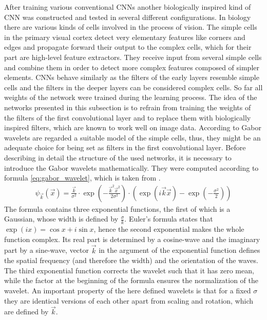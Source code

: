 \documentclass[11pt, a4paper]{article}
\begin{document}
After training various conventional \acp{CNN} another biologically inspired kind of \ac{CNN} was constructed and tested in several different configurations. In biology there are various kinds of cells involved in the process of vision. The simple cells in the primary visual cortex detect very elementary features like corners and edges and propagate forward their output to the complex cells, which for their part are high-level feature extractors. They receive input from several simple cells and combine them in order to detect more complex features composed of simpler elements. \acp{CNN} behave similarly as the filters of the early layers resemble simple cells and the filters in the deeper layers can be considered complex cells. So far all weights of the network were trained during the learning process. The idea of the networks presented in this subsection is to refrain from training the weights of the filters of the first convolutional layer and to replace them with biologically inspired filters, which are known to work well on image data. According to \cite{ebgm} Gabor wavelets are regarded a suitable model of the simple cells, thus, they might be an adequate choice for being set as filters in the first convolutional layer. Before describing in detail the structure of the used networks, it is necessary to introduce the Gabor wavelets mathematically. They were computed according to formula \eqref{eq:gabor_wavelet}, which is taken from \cite{ebgm}.
\begin{align}
\label{eq:gabor_wavelet}
\psi_{\vec{k}}(\vec{x}) = \frac{\vec{k}}{\sigma^2} \cdot \exp\left(-\frac{\vec{k}^2\vec{x}^2}{2\sigma^2}\right) \cdot \left(\exp\left(i\vec{k}\vec{x}\right) - \exp\left(-\frac{\sigma^2}{2}\right)\right)
\end{align}
The formula contains three exponential functions, the first of which is a Gaussian, whose width is defined by $\frac{\sigma}{k}$. Euler's formula states that $\exp(ix) = \cos x + i \sin x$, hence the second exponential makes the whole function complex. Its real part is determined by a cosine-wave and the imaginary part by a sine-wave, vector $\vec{k}$ in the argument of the exponential function defines the spatial frequency (and therefore the width) and the orientation of the waves. The third exponential function corrects the wavelet such that it has zero mean, while the factor at the beginning of the formula ensures the normalization of the wavelet. An important property of the here defined wavelets is that for a fixed $\sigma$ they are identical versions of each other apart from scaling and rotation, which are defined by $\vec{k}$.\\
\end{document}
